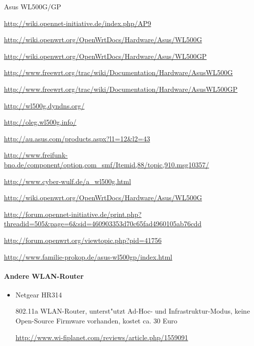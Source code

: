 \begin{wlandevice}{Asus WL500G/GP}
\begin{wlanlink}
\item \url{http://wiki.opennet-initiative.de/index.php/AP9}
\item \url{http://wiki.openwrt.org/OpenWrtDocs/Hardware/Asus/WL500G}
\item \url{http://wiki.openwrt.org/OpenWrtDocs/Hardware/Asus/WL500GP}
\item \url{http://www.freewrt.org/trac/wiki/Documentation/Hardware/AsusWL500G}
\item \url{http://www.freewrt.org/trac/wiki/Documentation/Hardware/AsusWL500GP}
\item \url{http://wl500g.dyndns.org/}
\item \url{http://oleg.wl500g.info/}
\item \url{http://au.asus.com/products.aspx?l1=12&l2=43}
\item \url{http://www.freifunk-bno.de/component/option,com_smf/Itemid,88/topic,910.msg10357/}
\item \url{http://www.cyber-wulf.de/a_wl500g.html}
\item \url{http://wiki.openwrt.org/OpenWrtDocs/Hardware/Asus/WL500G}
\item \url{http://forum.opennet-initiative.de/print.php?threadid=505&page=6&sid=460903353d70c65fad4960105ab76cdd}
\item \url{http://forum.openwrt.org/viewtopic.php?pid=41756}
\item \url{http://www.familie-prokop.de/asus-wl500gp/index.html}
\end{wlanlink}

\end{wlandevice}

\paragraph{Andere WLAN-Router}

\begin{itemize}

\item Netgear HR314

802.11a WLAN-Router, unterst"utzt Ad-Hoc- und Infrastruktur-Modus,
keine Open-Source Firmware vorhanden, kostet ca. 30 Euro

\url{http://www.wi-fiplanet.com/reviews/article.php/1559091}

\end{itemize}
